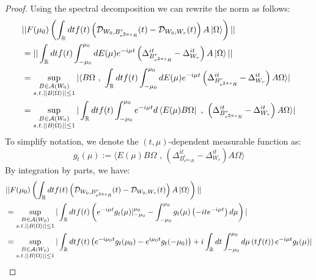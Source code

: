 \documentclass[a4paper,11pt]{article}
\theoremstyle{definition}
\newcommand{\lb}{\left(}
\newcommand{\rb}{\right)}
\begin{document}
\begin{proof}
    Using the spectral decomposition we can rewrite the norm as follows:
    \begin{align}
        \begin{split}
            &||F(\mu_0)\lb\int_\mathbb{R} dt f(t)\lb \mathcal{D}_{W_0, B^r_{e^{2\pi s}R}}(t) - \mathcal{D}_{W_0, W_r}(t) \rb A\ket{\Omega}\rb||
            \\&= ||\int_\mathbb{R} dtf(t)\int_{-\mu_0}^{\mu_0}dE(\mu) e^{-i\mu t}\lb\Delta_{B^r_{e^{2\pi s}R}}^{it} - \Delta_{W_r}^{it}\rb A\ket{\Omega}||
            \\&
            =\sup_{\substack{B\in\mathcal{A}(W_0)\\s.t.||B\ket{\Omega}||\leq 1}}|\langle B\Omega\text{ , }\int_\mathbb{R}dt f(t)\int_{-\mu_0}^{\mu_0}dE(\mu)e^{-i\mu t}\lb\Delta_{B^r_{e^{2\pi s}R}}^{it} - \Delta_{W_r}^{it}\rb A\Omega\rangle|
            \\&
            =\sup_{\substack{B\in\mathcal{A}(W_0)\\ s.t.||B\ket{\Omega}||\leq 1}}|\int_\mathbb{R}dt f(t)\int_{-\mu_0}^{\mu_0}e^{-i\mu t}d\bra{E(\mu) B\Omega}\text{ , }\lb\Delta_{B^r_{e^{2\pi s}R}}^{it} - \Delta_{W_r}^{it}\rb A\Omega\rangle|
        \end{split}
    \end{align}
    To simplify notation, we denote the $(t,\mu)$-dependent measurable function as:
    \begin{equation}
        g_t(\mu) := \langle E(\mu) B\Omega\text{ , }\lb\Delta^{it}_{B^r_{e^{2\pi s}R}} - \Delta^{it}_{W_r}\rb A\Omega\rangle
    \end{equation}
    By integration by parts, we have:
    \begin{align}
        \begin{split}
            &||F(\mu_0)\lb\int_\mathbb{R} dt f(t)\lb\mathcal{D}_{W_0, B^r_{e^{2\pi s}R}}(t) - \mathcal{D}_{W_0, W_r}(t)\rb A\ket{\Omega}\rb||
            \\&
            =\sup_{\substack{B\in\mathcal{A}(W_0)\\s.t.||B\ket{\Omega}||\leq 1}}|\int_\mathbb{R}dt f(t)\lb e^{-i\mu t}g_t(\mu)|_{-\mu_0}^{\mu_0} - \int_{-\mu_0}^{\mu_0}g_t(\mu)\lb-ite^{-i\mu t}\rb d\mu \rb|
            \\&
            =\sup_{\substack{B\in\mathcal{A}(W_0)\\s.t.||B\ket{\Omega}||\leq 1}}|\int_\mathbb{R} dt f(t) \lb e^{-i\mu_0 t}g_t(\mu_0)- e^{i\mu_0 t}g_t(-\mu_0)\rb + i\int_\mathbb{R} dt \int_{-\mu_0}^{\mu_0} d\mu \lb tf(t)\rb e^{-i\mu t} g_t(\mu)|

\end{split}
\end{align}
\end{proof}
\end{document}
